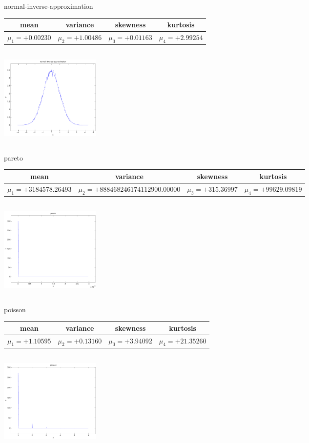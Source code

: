\documentclass[9pt]{article}
\theoremstyle{plain}
\theoremstyle{definition}
\theoremstyle{remark}
\numberwithin{equation}{section}
\begin{document}
\newpage
normal-inverse-approximation \begin{tabular}{|c|c|c|c|}  mean & variance & skewness & kurtosis \\  \hline
$\mu_1 = +0.00230$ & $\mu_2 = +1.00486$ & $\mu_3 = +0.01163$ & $\mu_4 =+2.99254$ \\
\end{tabular}

\includegraphics[width=5cm,height=5cm]{normal-inverse-approximation.pdf}

pareto \begin{tabular}{|c|c|c|c|}  mean & variance & skewness & kurtosis \\  \hline
$\mu_1 = +3184578.26493$ & $\mu_2 = +888468246174112900.00000$ & $\mu_3 = +315.36997$ & $\mu_4 =+99629.09819$ \\
\end{tabular}

\includegraphics[width=5cm,height=5cm]{pareto.pdf}

poisson \begin{tabular}{|c|c|c|c|}  mean & variance & skewness & kurtosis \\  \hline
$\mu_1 = +1.10595$ & $\mu_2 = +0.13160$ & $\mu_3 = +3.94092$ & $\mu_4 =+21.35260$ \\
\end{tabular}

\includegraphics[width=5cm,height=5cm]{poisson.pdf}
\end{document}
